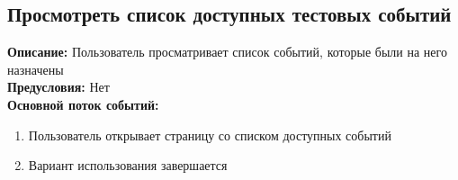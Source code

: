 \documentclass{article}
\begin{document}




    \subsection{Просмотреть список доступных тестовых событий}
    \textbf{Описание:} Пользователь просматривает список событий, которые были на него назначены\\
    \textbf{Предусловия:} Нет\\
    \textbf{Основной поток событий:}
    \begin{enumerate}
        \item Пользователь открывает страницу со списком доступных событий
        \item Вариант использования завершается
    \end{enumerate}
\end{document}
